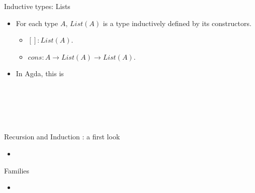 \documentclass[10 pt., handout]{beamer}
\theoremstyle{plain}
\theoremstyle{remark}
\begin{document}
\begin{frame}{Inductive types: Lists}

\begin{itemize}

\item For each type $A$, $List(A)$ is a type inductively defined by its constructors.
\begin{itemize}
\item $[] : List(A)$.
\item $cons : A \to List(A) \to List(A)$.
\end{itemize}

\item In Agda, this is

\begin{code}\>\<%
\\
\> \AgdaSymbol{(} \AgdaSymbol{:} \AgdaSymbol{)} \AgdaSymbol{:}  \<%
\\
\>[0]\<[2]%
\>[2]\AgdaInductiveConstructor{[]} \AgdaSymbol{:}  \<%
\\
\>[0]\<[2]%
\>[2]\AgdaInductiveConstructor{\_::\_} \AgdaSymbol{:}        \<%
\\
\>\<\end{code}


\end{itemize}

\end{frame}




\begin{frame}{Recursion and Induction : a first look}

\begin{itemize}

  \item


\end{itemize}

\end{frame}



\begin{frame}{Families}

\begin{itemize}

  \item


\end{itemize}

\end{frame}
\end{document}
